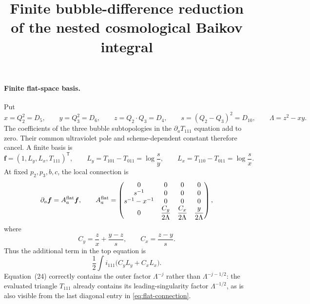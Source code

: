 \documentclass[11pt]{article}
\title{Finite bubble-difference reduction of the nested cosmological Baikov integral}
\author{}
\date{}
\begin{document}
\maketitle

\paragraph{Finite flat-space basis.}
Put
\begin{equation}
 x=Q_2^2=D_5,\qquad y=Q_3^2=D_6,\qquad
 z=Q_2\!\cdot Q_3=D_4,\qquad
 s=(Q_2-Q_3)^2=D_{10},\qquad
 \Lambda=z^2-xy .
\end{equation}
The coefficients of the three bubble subtopologies in the
$\partial_aT_{111}$ equation add to zero.  Their common ultraviolet pole
and scheme-dependent constant therefore cancel.  A finite basis is
\begin{equation}
 \bm f=(1,L_y,L_x,T_{111})^{\mathsf T},\qquad
 L_y=T_{101}-T_{011}=\log\frac{s}{y},\qquad
 L_x=T_{110}-T_{011}=\log\frac{s}{x}.
\end{equation}
At fixed $p_2,p_3,b,c$, the local connection is
\begin{equation}
 \partial_a\bm f=A_a^{\rm flat}\bm f,
 \qquad
 A_a^{\rm flat}=
 \begin{pmatrix}
 0&0&0&0\\
 s^{-1}&0&0&0\\
 s^{-1}-x^{-1}&0&0&0\\
 0&\dfrac{C_y}{2\Lambda}&\dfrac{C_x}{2\Lambda}
   &\dfrac{y}{2\Lambda}
 \end{pmatrix},
 \label{eq:flat-connection}
\end{equation}
where
\begin{equation}
 C_y=\frac{z}{x}+\frac{y-z}{s},\qquad
 C_x=\frac{z-y}{s}.
\end{equation}
Thus the additional term in the top equation is
\begin{equation}
 \frac12\int i_{111}\bigl(C_yL_y+C_xL_x\bigr).
\end{equation}
Equation~(24) correctly contains the outer factor $\Lambda^{-j}$ rather
than $\Lambda^{-j-1/2}$: the evaluated triangle $T_{111}$ already contains
its leading-singularity factor $\Lambda^{-1/2}$, as is also visible from
the last diagonal entry in \eqref{eq:flat-connection}.
\end{document}

